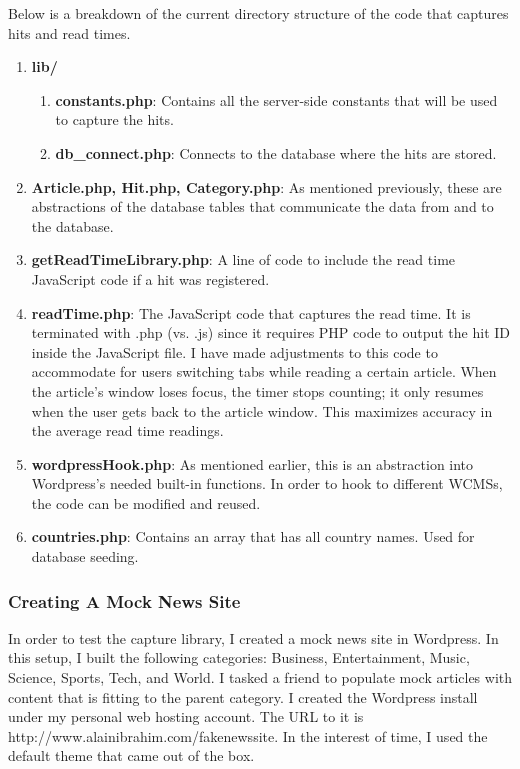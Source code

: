 \documentclass[12pt]{article}
\begin{document}
{\noindent Below is a breakdown of the current directory structure of the code that captures hits and read times.
\begin{enumerate}
\item \textbf{lib/}
\begin{enumerate}
\item \textbf{constants.php}: Contains all the server-side constants that will be used to capture the hits.
\item \textbf{db\_connect.php}: Connects to the database where the hits are stored.
\end{enumerate}
\item \textbf{Article.php, Hit.php, Category.php}: As mentioned previously, these are abstractions of the database tables that communicate the data from and to the database.
\item \textbf{getReadTimeLibrary.php}: A line of code to include the read time JavaScript code if a hit was registered.
\item \textbf{readTime.php}: The JavaScript code that captures the read time. It is terminated with .php (vs. .js) since it requires PHP code to output the hit ID inside the JavaScript file. I have made adjustments to this code to accommodate for users switching tabs while reading a certain article. When the article's window loses focus, the timer stops counting; it only resumes when the user gets back to the article window. This maximizes accuracy in the average read time readings.
\item \textbf{wordpressHook.php}: As mentioned earlier, this is an abstraction into Wordpress's needed built-in functions. In order to hook to different WCMSs, the code can be modified and reused. 
\item \textbf{countries.php}: Contains an array that has all country names. Used for database seeding.
\end{enumerate}

\newpage

\subsubsection{Creating A Mock News Site} 
In order to test the capture library, I created a mock news site in Wordpress. In this setup, I built the following categories: Business, Entertainment, Music, Science, Sports, Tech, and World. I tasked a friend to populate mock articles with content that is fitting to the parent category. I created the Wordpress install under my personal web hosting account. The URL to it is http://www.alainibrahim.com/fakenewssite. In the interest of time, I used the default theme that came out of the box. \\

}
\end{document}
